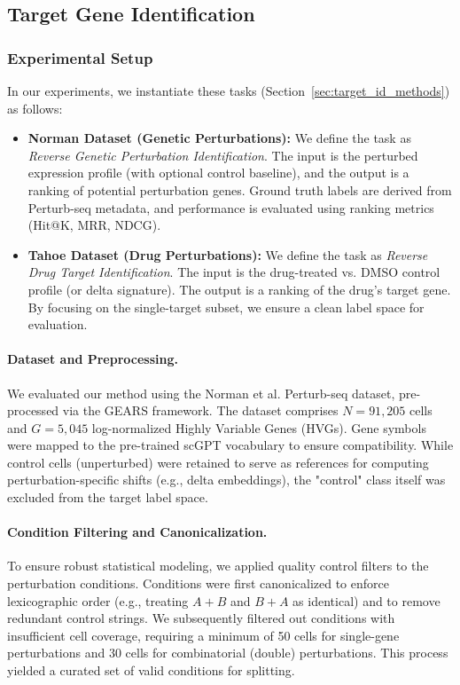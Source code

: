 \documentclass{article}
\begin{document}
\subsection{Target Gene Identification}

\subsubsection{Experimental Setup}

In our experiments, we instantiate these tasks (Section~\ref{sec:target_id_methods}) as follows:
\begin{itemize}
    \item \textbf{Norman Dataset (Genetic Perturbations):} We define the task as \textit{Reverse Genetic Perturbation Identification}. The input is the perturbed expression profile (with optional control baseline), and the output is a ranking of potential perturbation genes. Ground truth labels are derived from Perturb-seq metadata, and performance is evaluated using ranking metrics (Hit@K, MRR, NDCG).
    \item \textbf{Tahoe Dataset (Drug Perturbations):} We define the task as \textit{Reverse Drug Target Identification}. The input is the drug-treated vs. DMSO control profile (or delta signature). The output is a ranking of the drug's target gene. By focusing on the single-target subset, we ensure a clean label space for evaluation.
\end{itemize}

\paragraph{Dataset and Preprocessing.}
We evaluated our method using the Norman et al. Perturb-seq dataset, pre-processed via the GEARS framework. The dataset comprises $N=91,205$ cells and $G=5,045$ log-normalized Highly Variable Genes (HVGs). Gene symbols were mapped to the pre-trained scGPT vocabulary to ensure compatibility. While control cells (unperturbed) were retained to serve as references for computing perturbation-specific shifts (e.g., delta embeddings), the "control" class itself was excluded from the target label space.

\paragraph{Condition Filtering and Canonicalization.}
To ensure robust statistical modeling, we applied quality control filters to the perturbation conditions. Conditions were first canonicalized to enforce lexicographic order (e.g., treating $A+B$ and $B+A$ as identical) and to remove redundant control strings. We subsequently filtered out conditions with insufficient cell coverage, requiring a minimum of 50 cells for single-gene perturbations and 30 cells for combinatorial (double) perturbations. This process yielded a curated set of valid conditions for splitting.
\end{document}

